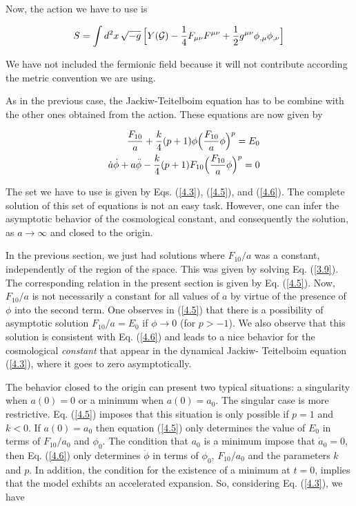 \documentclass[a4paper,twocolumn,prd,groupedaddress,nofootinbib,showpacs]
{revtex4}
\begin{document}
Now, the action we have to use is

\begin{equation}
S=\int d^2x\,\sqrt{-g}\,\Bigl[Y({\cal G})
-\frac{1}{4}F_{\mu\nu}F^{\mu\nu}
+\frac{1}{2}g^{\mu\nu}\phi_{,\mu}\phi_{,\nu}\Bigr]
\label{4.4}
\end{equation}

\noindent
We have not included the fermionic field because it will not
contribute according the metric convention we are using.

\medskip
As in the previous case, the Jackiw-Teitelboim equation has to be
combine with the other ones obtained from the action. These equations
are now given by

\begin{eqnarray}
&&\frac{F_{10}}{a}
+\frac{k}{4}(p+1)\phi\Bigl(\frac{F_{10}}{a}\phi\Bigr)^p=E_0
\label{4.5}\\
&&\dot a\dot\phi+a\ddot\phi
-\frac{k}{4}(p+1)F_{10}\Bigl(\frac{F_{10}}{a}\phi\Bigr)^p=0
\label{4.6}
\end{eqnarray}

The set we have to use is given by Eqs. (\ref{4.3}), (\ref{4.5}), and
(\ref{4.6}). The complete solution of this set of equations is not an
easy task. However, one can infer the asymptotic behavior of the
cosmological constant, and consequently the solution, as
$a\rightarrow\infty$ and closed to the origin.

\medskip
In the previous section, we just had solutions where $F_{10}/a$ was a
constant, independently of the region of the space. This was given by
solving Eq. (\ref{3.9}). The corresponding relation in the present
section is given by Eq. (\ref{4.5}). Now, $F_{10}/a$ is not
necessarily a constant for all values of $a$ by virtue of the presence
of $\phi$ into the second term. One observes in (\ref{4.5}) that there
is a possibility of asymptotic solution $F_{10}/a=E_0$ if
$\phi\rightarrow0$ (for $p>-1$). We also observe that this solution is
consistent with Eq. (\ref{4.6}) and leads to a nice behavior for the
cosmological {\it constant} that appear in the dynamical Jackiw-
Teitelboim equation (\ref{4.3}), where it goes to zero asymptotically.

\medskip
The behavior closed to the origin can present two typical situations:
a singularity when $a(0)=0$ or a minimum when $a(0)=a_0$. The singular
case is more restrictive. Eq. (\ref{4.5}) imposes that this situation
is only possible if $p=1$ and $k<0$. If $a(0)=a_0$ then equation
(\ref{4.5}) only determines the value of $E_0$ in terms of $F_{10}
/a_0$ and $\phi_0$. The condition that $a_0$ is a minimum impose that
$\dot a_0=0$, then Eq. (\ref{4.6}) only determines $\ddot\phi$ in
terms of $\phi_0$, $F_{10}/a_0$ and the parameters $k$ and $p$. In
addition, the condition for the existence of a minimum at $t=0$,
implies that the model exhibts an accelerated expansion. So,
considering Eq. (\ref{4.3}), we have
\end{document}
